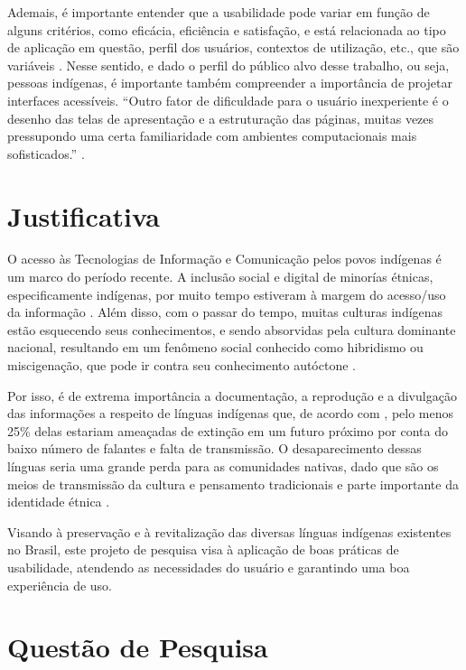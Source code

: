 Ademais, é importante entender que a usabilidade pode variar em função de alguns critérios, como eficácia, eficiência e satisfação, e está relacionada ao tipo de
aplicação em questão, perfil dos usuários, contextos de utilização, etc., que são variáveis \cite{winckler2022}. Nesse sentido, e dado o perfil do público alvo desse
trabalho, ou seja, pessoas indígenas, é importante também compreender a importância de projetar interfaces acessíveis. ``Outro fator de dificuldade para o usuário
inexperiente é o desenho das telas de apresentação e a estruturação das páginas, muitas vezes pressupondo uma certa familiaridade com ambientes computacionais mais
sofisticados.'' \cite{takashi2000}.

\section{Justificativa}
\label{sec:Justificativa}

O acesso às Tecnologias de Informação e Comunicação pelos povos indígenas é um marco do período recente. A inclusão social e digital de minorías étnicas, especificamente
indígenas, por muito tempo estiveram à margem do acesso/uso da informação \cite{pinto2010}. Além disso, com o passar do tempo, muitas culturas indígenas estão esquecendo
seus conhecimentos, e sendo absorvidas pela cultura dominante nacional, resultando em um fenômeno social conhecido como hibridismo ou miscigenação, que pode ir contra seu
conhecimento autóctone \cite{pinto2010}.

Por isso, é de extrema importância a documentação, a reprodução e a divulgação das informações a respeito de línguas indígenas que, de acordo com ,
pelo menos 25\% delas estariam ameaçadas de extinção em um futuro próximo por conta do baixo número de falantes e falta de transmissão. O desaparecimento dessas línguas
seria uma grande perda para as comunidades nativas, dado que são os meios de transmissão da cultura e pensamento tradicionais e parte importante da identidade étnica
\cite{moore2008}.

Visando à preservação e à revitalização das diversas línguas indígenas existentes no Brasil, este projeto de pesquisa visa à aplicação de boas práticas de usabilidade,
atendendo as necessidades do usuário e garantindo uma boa experiência de uso.


\section{Questão de Pesquisa}
\label{sec:QuestaodePesquisa}

